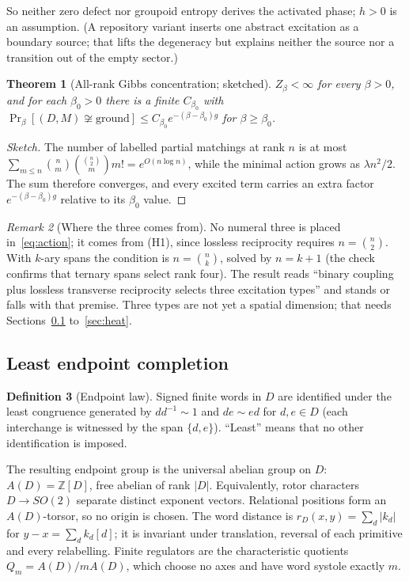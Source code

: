 \documentclass[11pt]{article}
\newtheorem{theorem}{Theorem}[section]
\theoremstyle{definition}
\newtheorem{definition}[theorem]{Definition}
\theoremstyle{remark}
\newtheorem{remark}[theorem]{Remark}
\newcommand{\Z}{\mathbb{Z}}
\begin{document}
So neither zero defect nor groupoid entropy derives the activated phase; $h>0$ is an
assumption. (A repository variant inserts one abstract excitation as a boundary source;
that lifts the degeneracy but explains neither the source nor a transition out of the
empty sector.)

\begin{theorem}[All-rank Gibbs concentration; sketched]
\label{thm:gibbs}
$Z_\beta<\infty$ for every $\beta>0$, and for each $\beta_0>0$ there is a finite
$C_{\beta_0}$ with $\Pr_\beta[(D,M)\not\cong\text{ground}]\le C_{\beta_0}e^{-(\beta-\beta_0)g}$
for $\beta\ge\beta_0$.
\end{theorem}

\begin{proof}[Sketch]
The number of labelled partial matchings at rank $n$ is at most
$\sum_{m\le n}\binom nm\binom{\binom n2}{m}m!=e^{O(n\log n)}$, while the minimal action grows
as $\lambda n^2/2$. The sum therefore converges, and every excited term carries an extra
factor $e^{-(\beta-\beta_0)g}$ relative to its $\beta_0$ value.
\end{proof}

\begin{remark}[Where the three comes from]
\label{rem:three}
No numeral three is placed in~\eqref{eq:action}; it comes from (H1), since lossless
reciprocity requires $n=\binom n2$. With $k$-ary spans the condition is $n=\binom nk$,
solved by $n=k+1$ (the check confirms that ternary spans select rank four). The result
reads ``binary coupling plus lossless transverse reciprocity selects three excitation
types'' and stands or falls with that premise. Three types are not yet a spatial
dimension; that needs Sections~\ref{sec:endpoint} to~\ref{sec:heat}.
\end{remark}

\subsection{Least endpoint completion}
\label{sec:endpoint}

\begin{definition}[Endpoint law]
Signed finite words in $D$ are identified under the least congruence generated by
$dd^{-1}\sim1$ and $de\sim ed$ for $d,e\in D$ (each interchange is witnessed by the span
$\{d,e\}$). ``Least'' means that no other identification is imposed.
\end{definition}

The resulting endpoint group is the universal abelian group on $D$: $A(D)=\Z[D]$, free
abelian of rank $|D|$. Equivalently, rotor characters $D\to SO(2)$ separate distinct
exponent vectors. Relational positions form an $A(D)$-torsor, so no origin is chosen.
The word distance is $r_D(x,y)=\sum_d|k_d|$ for $y-x=\sum_dk_d[d]$; it is invariant
under translation, reversal of each primitive and every relabelling. Finite regulators
are the characteristic quotients $Q_m=A(D)/mA(D)$, which choose no axes and have word
systole exactly $m$.
\end{document}
